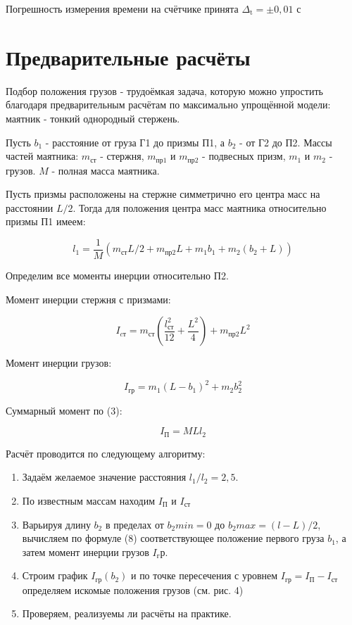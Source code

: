 \documentclass{article}
\begin{document}
Погрешность измерения времени на счётчике принята  $\Delta_{\text{t}} = \pm 0,01$ с

\section*{Предварительные расчёты}

\hspace{4mm} Подбор положения грузов - трудоёмкая задача, которую можно упростить благодаря предварительным расчётам по максимально упрощённой модели: маятник - тонкий однородный стержень.

Пусть $b_1$ - расстояние от груза Г1 до призмы П1, а $b_2$ - от Г2 до П2. Массы частей маятника: $m_{ст}$ - стержня, $m_{пр1}$ и  $m_{пр2}$ - подвесных призм, $m_{1}$ и $m_{2}$ - грузов. $M$ - полная масса маятника.

Пусть призмы расположены на стержне симметрично его центра масс на расстоянии $L/2$. Тогда для положения центра масс маятника относительно призмы П1 имеем:

\begin{equation}
	l_1 = \frac{1}{M} (m_{ст} L/2 + m_{пр2} L + m_{1}b_1 + m_{2}(b_2 + L))
\end{equation}

Определим все моменты инерции относительно П2.

Момент инерции стержня с призмами:

\begin{equation}
	I_{cт} = m_{ст} (\frac{l_{ст}^2}{12} + \frac{L^2}{4}) + m_{пр2}L^2
\end{equation}

Момент инерции грузов:

\begin{equation}
	I_{гр} = m_{1} (L - b_1)^2 + m_{2}b_2^2
\end{equation}

Суммарный момент по (3):

\begin{equation}
	I_{П} = MLl_2
\end{equation}

Расчёт проводится по следующему алгоритму:

\begin{enumerate}
	\item Задаём желаемое значение расстояния $l_1/l_2 = 2,5$.
	
	\item По известным массам находим $I_П$ и $I_{ст}$ 
	
	\item Варьируя длину $b_2$ в пределах от $b_2min = 0$ до $b_2max = (l - L)/2$, вычисляем по формуле (8) соответствующее положение первого груза $b_1$, а затем момент инерции грузов $I_гр$.
	
	\item Строим график $I_{гр}(b_2)$ и по точке пересечения с уровнем $I_{гр} = I_{П} - I_{ст}$ определяем искомые положения грузов (см. рис. 4)
	
	\item Проверяем, реализуемы ли расчёты на практике.
	
\end{enumerate}
\end{document}
